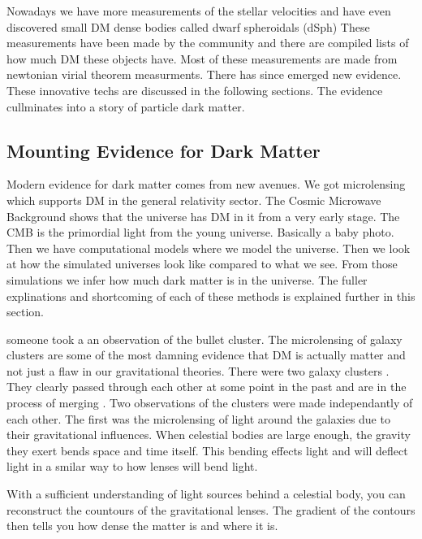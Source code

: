 
Nowadays we have more measurements of the stellar velocities and have even discovered small DM dense bodies called dwarf spheroidals (dSph)
These measurements have been made by the community \fu and there are compiled lists of how much DM these objects have.
Most of these measurements are made from newtonian virial theorem measurments.
There has since emerged new evidence.
These innovative techs are discussed in the following sections. The evidence cullminates into a story of particle dark matter.

\subsection{Mounting Evidence for Dark Matter\label{secc:ev4dm_more}}
Modern evidence for dark matter comes from new avenues.
We got microlensing which supports DM in the general relativity sector.
The Cosmic Microwave Background shows that the universe has DM in it from a very early stage.
The CMB is the primordial light from the young universe.
Basically a baby photo.
Then we have computational models where we model the universe.
Then we look at how the simulated universes look like compared to what we see.
From those simulations we infer how much dark matter is in the universe.
The fuller explinations and shortcoming of each of these methods is explained further in this section.

someone took a an observation of the bullet cluster.
The microlensing of galaxy clusters are some of the most damning evidence that DM is actually matter and not just a flaw in our gravitational theories.
There were two galaxy clusters \fu.
They clearly passed through each other at some point in the past and are in the process of merging \ns.
Two observations of the clusters were made independantly of each other.
The first was the microlensing of light around the galaxies due to their gravitational influences.
When celestial bodies are large enough, the gravity they exert bends space and time itself.
This bending effects light and will deflect light in a smilar way to how lenses will bend light.


With a sufficient understanding of light sources behind a celestial body, you can reconstruct the countours of the gravitational lenses.
The gradient of the contours then tells you how dense the matter is and where it is.

